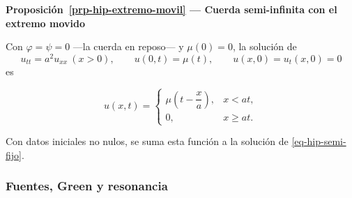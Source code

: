 \documentclass[
  spanish,
  a4paper,
]{scrbook}
\theoremstyle{definition}
\theoremstyle{plain}
\theoremstyle{definition}
\theoremstyle{plain}
\theoremstyle{definition}
\theoremstyle{remark}
\begin{document}
\begin{tcolorbox}[enhanced jigsaw, arc=.35mm, bottomrule=.15mm, breakable, colback=white, colframe=quarto-callout-note-color-frame, left=2mm, leftrule=.75mm, opacityback=0, rightrule=.15mm, toprule=.15mm]
\begin{minipage}[t]{5.5mm}
\textcolor{quarto-callout-note-color}{\faInfo}
\end{minipage}%
\begin{minipage}[t]{\textwidth - 5.5mm}

\vspace{-3mm}\textbf{Proposición~\ref{prp-hip-extremo-movil} --- Cuerda semi-infinita con el
extremo movido}\vspace{3mm}

Con \(\varphi = \psi = 0\) ---la cuerda en reposo--- y \(\mu(0) = 0\),
la solución de
\[u_{tt} = a^2u_{xx}\ (x>0),\qquad u(0,t) = \mu(t),\qquad u(x,0) = u_t(x,0) = 0\]
es

\[
u(x,t) = \begin{cases} \mu\!\left(t - \dfrac{x}{a}\right), & x < at,\\[2mm] 0, & x\ge at.\end{cases}
\]

Con datos iniciales no nulos, se suma esta función a la solución de
\ref{eq-hip-semi-fijo}.

\end{minipage}%
\end{tcolorbox}

\subsubsection{Fuentes, Green y
resonancia}\label{fuentes-green-y-resonancia}
\end{document}
